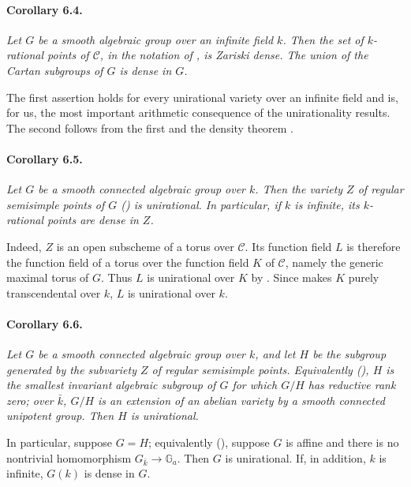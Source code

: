 
\paragraph{\textbf{Corollary 6.4.}}
{\itshape Let \(G\) be a smooth algebraic group over an infinite
field \(k\). Then the set of \(k\)-rational points of
\(\mathcal C\), in the notation of , is Zariski dense. The
union of the Cartan subgroups of \(G\) is dense in \(G\).}

The first assertion holds for every unirational variety over an
infinite field and is, for us, the most important arithmetic
consequence of the unirationality results. The second follows from
the first and the density theorem .

\paragraph{\textbf{Corollary 6.5.}}
{\itshape Let \(G\) be a smooth connected algebraic group over
\(k\). Then the variety \(Z\) of regular semisimple points of
\(G\) \textup{()} is unirational. In particular, if
\(k\) is infinite, its \(k\)-rational points are dense in \(Z\).}

Indeed, \(Z\) is an open subscheme of a torus over
\(\mathcal C\). Its function field \(L\) is therefore the
function field of a torus over the function field \(K\) of
\(\mathcal C\), namely the generic maximal torus of \(G\). Thus
\(L\) is unirational over \(K\) by . Since  makes
\(K\) purely transcendental over \(k\), \(L\) is unirational
over \(k\).

\paragraph{\textbf{Corollary 6.6.}}
{\itshape Let \(G\) be a smooth connected algebraic group over
\(k\), and let \(H\) be the subgroup generated by the subvariety
\(Z\) of regular semisimple points. Equivalently
\textup{()}, \(H\) is the smallest invariant algebraic
subgroup of \(G\) for which \(G/H\) has reductive rank zero; over
\(\bar k\), \(G/H\) is an extension of an abelian variety by a
smooth connected unipotent group. Then \(H\) is unirational.

In particular, suppose \(G=H\); equivalently
\textup{()}, suppose \(G\) is affine and there is no
nontrivial homomorphism \(G_{\bar k}\to\mathbb G_a\). Then \(G\)
is unirational. If, in addition, \(k\) is infinite, \(G(k)\) is
dense in \(G\).}

